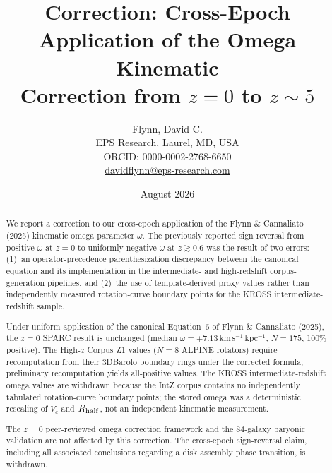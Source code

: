 \documentclass[a4paper,12pt]{article}
\title{Correction: Cross-Epoch Application of the Omega Kinematic\\
Correction from $z=0$ to $z\sim5$}
\author{
  Flynn, David C.\\
  \small EPS Research, Laurel, MD, USA\\
  \small ORCID: 0000-0002-2768-6650\\
  \small \href{mailto:davidflynn@eps-research.com}{davidflynn@eps-research.com}
}
\date{August 2026}
\newcommand{\om}{\omega}
\newcommand{\omunit}{km\,s$^{-1}$\,kpc$^{-1}$}
\begin{document}
\maketitle

\begin{center}
\end{center}

\vspace{1em}

\begin{abstract}
We report a correction to our cross-epoch application of the
Flynn \& Cannaliato (2025) kinematic omega parameter $\om$. The
previously reported sign reversal from positive $\om$ at $z=0$ to
uniformly negative $\om$ at $z\gtrsim0.6$ was the result of two
errors: (1)~an operator-precedence parenthesization discrepancy
between the canonical equation and its implementation in the
intermediate- and high-redshift corpus-generation pipelines, and
(2)~the use of template-derived proxy values rather than independently
measured rotation-curve boundary points for the KROSS
intermediate-redshift sample.

Under uniform application of the canonical Equation~6 of
Flynn \& Cannaliato (2025), the $z=0$ SPARC result is unchanged
(median $\om = +7.13$\,\omunit, $N=175$, 100\% positive). The
High-$z$ Corpus Z1 values ($N=8$ ALPINE rotators) require
recomputation from their 3DBarolo boundary rings under the corrected
formula; preliminary recomputation yields all-positive values. The
KROSS intermediate-redshift omega values are withdrawn because the
IntZ corpus contains no independently tabulated rotation-curve
boundary points; the stored omega was a deterministic rescaling of
$V_c$ and $R_{\rm half}$, not an independent kinematic measurement.

The $z=0$ peer-reviewed omega correction framework
\citep{flynnCannaliato2025} and the 84-galaxy baryonic validation
\citep{flynn2026baryonic} are not affected by this correction.
The cross-epoch sign-reversal claim, including all associated
conclusions regarding a disk assembly phase transition, is withdrawn.
\end{abstract}
\end{document}
